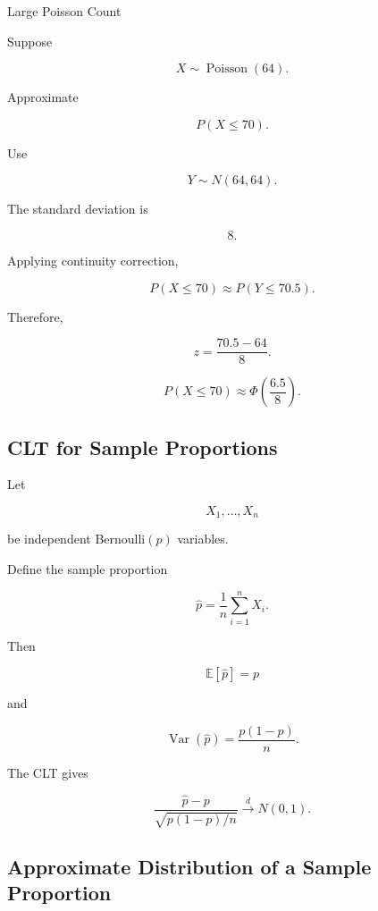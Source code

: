 \begin{workedexamplebox}{Large Poisson Count}

Suppose

\[
X\sim\operatorname{Poisson}(64).
\]

Approximate

\[
P(X\leq70).
\]

Use

\[
Y\sim N(64,64).
\]

The standard deviation is

\[
8.
\]

Applying continuity correction,

\[
P(X\leq70)
\approx
P(Y\leq70.5).
\]

Therefore,

\[
z
=
\frac{
70.5-64
}{8}.
\]

\begin{answerbox}
\[
\boxed{
P(X\leq70)
\approx
\Phi
\left(
\frac{6.5}{8}
\right).
}
\]
\end{answerbox}

\end{workedexamplebox}

\subsection{CLT for Sample Proportions}
\label{subsec:clt-sample-proportions}

Let

\[
X_1,\ldots,X_n
\]

be independent Bernoulli\((p)\) variables.

Define the sample proportion

\[
\boxed{
\widehat{p}
=
\frac1n
\sum_{i=1}^{n}X_i.
}
\]

Then

\[
\mathbb{E}[\widehat{p}]
=
p
\]

and

\[
\operatorname{Var}(\widehat{p})
=
\frac{
p(1-p)
}{n}.
\]

The CLT gives

\[
\boxed{
\frac{
\widehat{p}-p
}{
\sqrt{
p(1-p)/n
}
}
\xrightarrow{d}
N(0,1).
}
\]

\subsection{Approximate Distribution of a Sample Proportion}
\label{subsec:sample-proportion-approx}

